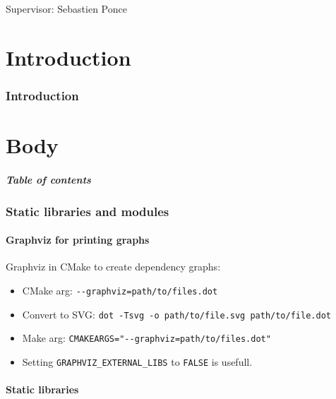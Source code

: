 \documentclass{beamer}
\begin{document}
\begin{frame}
    \maketitle

    Supervisor: Sebastien Ponce
\end{frame}

\part{Introduction}
\section*{Introduction}
\part{Body}

    \begin{frame}
        \frametitle{Table of contents}
        \tableofcontents
    \end{frame}

\section{Static libraries and modules}

    \subsection{Graphviz for printing graphs}

    \begin{frame}[fragile]
        Graphviz in CMake to create dependency graphs:
        \begin{itemize}
            \item CMake arg: \verb'--graphviz=path/to/files.dot'
            \item Convert to SVG: \verb'dot -Tsvg -o path/to/file.svg path/to/file.dot'
            \item Make arg: \verb'CMAKEARGS="--graphviz=path/to/files.dot"'
            \item Setting \verb'GRAPHVIZ_EXTERNAL_LIBS' to \verb'FALSE' is usefull.
        \end{itemize}

    \end{frame}

    \subsection{Static libraries}
\end{document}

